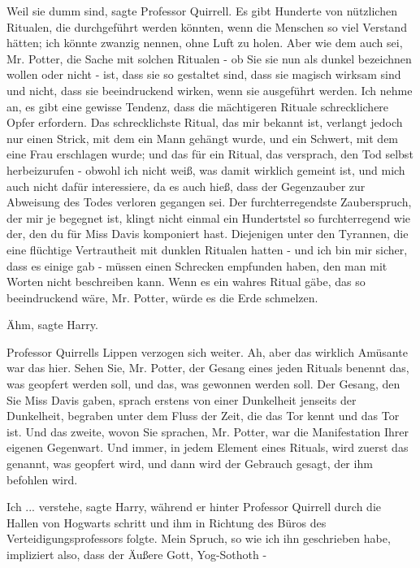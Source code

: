 \glqq Weil sie dumm sind\grqq{}, sagte Professor Quirrell. \glqq Es gibt
Hunderte von nützlichen Ritualen, die durchgeführt werden könnten, wenn die
Menschen so viel Verstand hätten; ich könnte zwanzig nennen, ohne Luft zu holen.
Aber wie dem auch sei, Mr. Potter, die Sache mit solchen Ritualen - ob Sie sie
nun als dunkel bezeichnen wollen oder nicht - ist, dass sie so gestaltet sind,
dass sie magisch wirksam sind und nicht, dass sie beeindruckend wirken, wenn sie
ausgeführt werden. Ich nehme an, es gibt eine gewisse Tendenz, dass die
mächtigeren Rituale schrecklichere Opfer erfordern. Das schrecklichste Ritual,
das mir bekannt ist, verlangt jedoch nur einen Strick, mit dem ein Mann gehängt
wurde, und ein Schwert, mit dem eine Frau erschlagen wurde; und das für ein
Ritual, das versprach, den Tod selbst herbeizurufen - obwohl ich nicht weiß, was
damit wirklich gemeint ist, und mich auch nicht dafür interessiere, da es auch
hieß, dass der Gegenzauber zur Abweisung des Todes verloren gegangen sei. Der
furchterregendste Zauberspruch, der mir je begegnet ist, klingt nicht einmal ein
Hundertstel so furchterregend wie der, den du für Miss Davis komponiert hast.
Diejenigen unter den Tyrannen, die eine flüchtige Vertrautheit mit dunklen
Ritualen hatten - und ich bin mir sicher, dass es einige gab - müssen einen
Schrecken empfunden haben, den man mit Worten nicht beschreiben kann. Wenn es
ein wahres Ritual gäbe, das so beeindruckend wäre, Mr. Potter, würde es die Erde
schmelzen.\grqq{}

\glqq Ähm\grqq{}, sagte Harry.

Professor Quirrells Lippen verzogen sich weiter. \glqq Ah, aber das wirklich
Amüsante war das hier. Sehen Sie, Mr. Potter, der Gesang eines jeden Rituals
benennt das, was geopfert werden soll, und das, was gewonnen werden soll. Der
Gesang, den Sie Miss Davis gaben, sprach erstens von einer Dunkelheit jenseits
der Dunkelheit, begraben unter dem Fluss der Zeit, die das Tor kennt und das Tor
ist. Und das zweite, wovon Sie sprachen, Mr. Potter, war die Manifestation Ihrer
eigenen Gegenwart. Und immer, in jedem Element eines Rituals, wird zuerst das
genannt, was geopfert wird, und dann wird der Gebrauch gesagt, der ihm befohlen
wird.\grqq{}

\glqq Ich ... verstehe\grqq{}, sagte Harry, während er hinter Professor Quirrell
durch die Hallen von Hogwarts schritt und ihm in Richtung des Büros des
Verteidigungsprofessors folgte. \glqq Mein Spruch, so wie ich ihn geschrieben
habe, impliziert also, dass der Äußere Gott, Yog-Sothoth -\grqq{}

